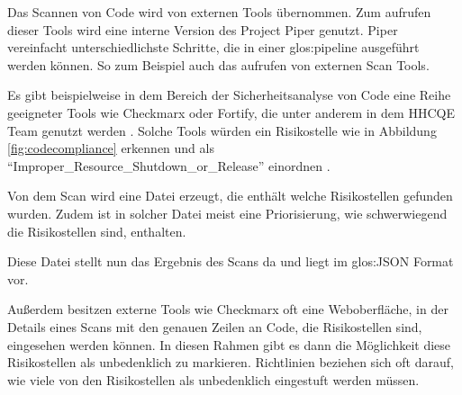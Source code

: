 \documentclass[../main.tex]{subfiles}
\begin{document}
Das Scannen von Code wird von externen Tools übernommen.
Zum aufrufen dieser Tools wird eine interne Version des Project Piper genutzt. Piper vereinfacht unterschiedlichste Schritte, die in einer \gls{glos:pipeline} ausgeführt werden können.
So zum Beispiel auch das aufrufen von externen Scan Tools. 

Es gibt beispielweise in dem Bereich der Sicherheitsanalyse von Code eine Reihe geeigneter Tools wie Checkmarx oder Fortify, die unter anderem in dem \gls{HHCQE} Team genutzt werden \cite{SASTTools}.
Solche Tools würden ein Risikostelle wie in Abbildung \ref{fig:codecompliance} erkennen und als \enquote{Improper\_Resource\_Shutdown\_or\_Release} einordnen \cite{SecurityVulnerabilities}.

Von dem Scan wird eine Datei erzeugt, die enthält welche Risikostellen gefunden wurden.
Zudem ist in solcher Datei meist eine Priorisierung, wie schwerwiegend die Risikostellen sind, enthalten.

Diese Datei stellt nun das Ergebnis des Scans da und liegt im \gls{glos:JSON} Format vor.

Außerdem besitzen externe Tools wie Checkmarx oft eine Weboberfläche, in der Details eines Scans mit den genauen Zeilen an Code, die Risikostellen sind, eingesehen werden können.
In diesen Rahmen gibt es dann die Möglichkeit diese Risikostellen als unbedenklich zu markieren.
Richtlinien beziehen sich oft darauf, wie viele von den Risikostellen als unbedenklich eingestuft werden müssen.
\end{document}
